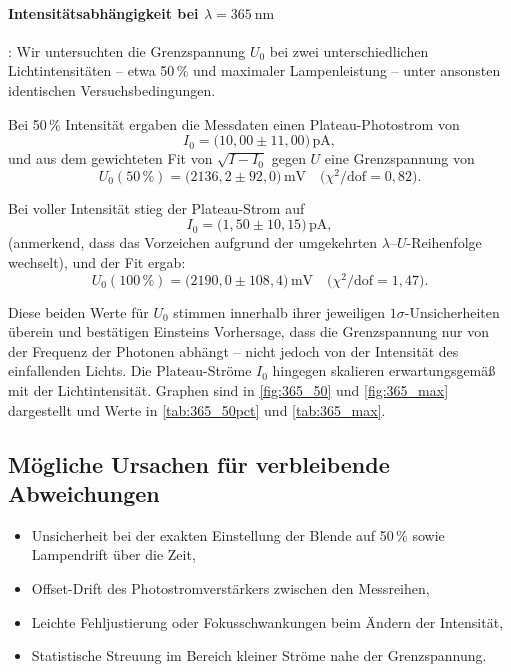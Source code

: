 \paragraph{Intensitätsabhängigkeit bei $\lambda = \SI{365}{\nano\meter}$} :
Wir untersuchten die Grenzspannung $U_0$ bei zwei unterschiedlichen Lichtintensitäten – etwa 50\,\% und maximaler Lampenleistung – unter ansonsten identischen Versuchsbedingungen.

Bei 50\,\% Intensität ergaben die Messdaten einen Plateau-Photostrom von
\begin{equation}
  I_0 = \bigl(10{,}00 \pm 11{,}00\bigr)\,\mathrm{pA},
\end{equation}
und aus dem gewichteten Fit von $\sqrt{I - I_0}$ gegen $U$ eine Grenzspannung von
\begin{equation}
  U_0(50\,\%) = \bigl(2136{,}2 \pm 92{,}0\bigr)\,\mathrm{mV}
  \quad\bigl(\chi^2/\mathrm{dof} = 0{,}82\bigr).
\end{equation}

Bei voller Intensität stieg der Plateau-Strom auf
\begin{equation}
  I_0 = \bigl(1{,}50 \pm 10{,}15\bigr)\,\mathrm{pA},
\end{equation}
(anmerkend, dass das Vorzeichen aufgrund der umgekehrten $\lambda$–$U$-Reihenfolge wechselt), und der Fit ergab:
\begin{equation}
  U_0(100\,\%) = \bigl(2190{,}0 \pm 108{,}4\bigr)\,\mathrm{mV}
  \quad\bigl(\chi^2/\mathrm{dof} = 1{,}47\bigr).
\end{equation}

Diese beiden Werte für $U_0$ stimmen innerhalb ihrer jeweiligen $1\sigma$-Unsicherheiten überein und bestätigen Einsteins Vorhersage, dass die Grenzspannung nur von der Frequenz der Photonen abhängt – nicht jedoch von der Intensität des einfallenden Lichts. Die Plateau-Ströme $I_0$ hingegen skalieren erwartungsgemäß mit der Lichtintensität. Graphen sind in \cref{fig:365_50} und \cref{fig:365_max} dargestellt und Werte in \cref{tab:365_50pct} und \cref{tab:365_max}.

\subsection*{Mögliche Ursachen für verbleibende Abweichungen}
\begin{itemize}
  \item Unsicherheit bei der exakten Einstellung der Blende auf 50\,\% sowie Lampendrift über die Zeit,
  \item Offset-Drift des Photostromverstärkers zwischen den Messreihen,
  \item Leichte Fehljustierung oder Fokusschwankungen beim Ändern der Intensität,
  \item Statistische Streuung im Bereich kleiner Ströme nahe der Grenzspannung.
\end{itemize}

